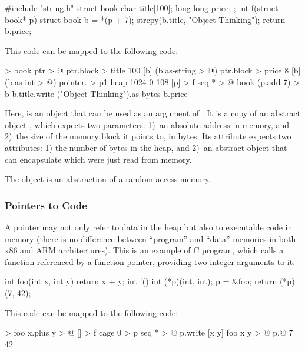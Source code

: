 \documentclass[sigplan,nonacm]{acmart}
\begin{document}
\begin{ffcode}
#include "string.h"
struct book {
  char title[100];
  long long price;
};
int f(struct book* p) {
  struct book b = *(p + 7);
  strcpy(b.title, "Object Thinking");
  return b.price;
}
\end{ffcode}

This code can be mapped to the following \eolang{} code:

\begin{ffcode}
[ptr] > book
  ptr > @
  ptr.block > title
    100
    [b] (b.as-string > @)
  ptr.block > price
    8
    [b] (b.as-int > @)
pointer. > p1
  heap 1024
  0
  108
[p] > f
  seq * > @
    book (p.add 7) > b
    b.title.write
      ("Object Thinking").as-bytes
    b.price
\end{ffcode}

Here,  is an object that can be used as an argument of . It is a copy of an abstract object , which expects two parameters: 1)~an absolute address in memory, and 2)~the size of the memory block it points to, in bytes. Its attribute  expects two attributes: 1) the number of bytes in the heap, and 2)~an abstract object that can encapsulate  which were just read from memory.

The object  is an abstraction of a random access memory.

\subsubsection{Pointers to Code}

A pointer may not only refer to data in the heap but also to executable code in memory (there is no difference between ``program'' and ``data'' memories in both x86 and ARM architectures). This is an example of C program, which calls a function referenced by a function pointer, providing two integer arguments to it:

\begin{ffcode}
int foo(int x, int y) {
  return x + y;
}
int f() {
  int (*p)(int, int);
  p = &foo;
  return (*p) (7, 42);
}
\end{ffcode}

This code can be mapped to the following \eolang{} code:

\begin{ffcode}
[x y] > foo
  x.plus y > @
[] > f
  cage 0 > p
  seq * > @
    p.write
      [x y]
        foo x y > @
    p.@ 7 42
\end{ffcode}
\end{document}
